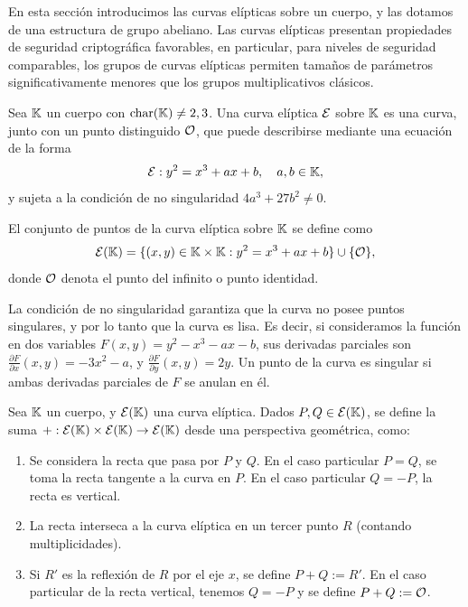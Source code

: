 
En esta sección introducimos las curvas elípticas sobre un cuerpo, y las dotamos de una estructura de grupo abeliano. Las curvas elípticas presentan propiedades de seguridad criptográfica favorables, en particular, para niveles de seguridad comparables, los grupos de curvas elípticas permiten tamaños de parámetros significativamente menores que los grupos multiplicativos clásicos.

\begin{definition}
\label{def:apendice-a-curvas-elipticas-curva-eliptica}
	Sea $\mathbb{K}$ un cuerpo con $\mathrm{char}(\mathbb{K}) \neq 2,3$. Una curva elíptica $\mathcal{E}$ sobre $\mathbb{K}$ es una curva, junto con un punto distinguido $\mathcal{O}$, que puede describirse mediante una ecuación de la forma
	$$\mathcal{E}: y^2 = x^3 + ax + b, \quad a,b \in \mathbb{K},$$
	y sujeta a la condición de no singularidad $4a^3 + 27b^2 \neq 0$.
	
	El conjunto de puntos de la curva elíptica sobre $\mathbb{K}$ se define como
	$$\mathcal{E}(\mathbb{K}) = \{(x,y) \in \mathbb{K} \times \mathbb{K}: y^2 = x^3 + ax + b\} \cup \{\mathcal{O}\},$$
	donde $\mathcal{O}$ denota el punto del infinito o punto identidad.
\end{definition}

La condición de no singularidad garantiza que la curva no posee puntos singulares, y por lo tanto que la curva es lisa. Es decir, si consideramos la función en dos variables $F(x,y) = y^2 - x^3 - ax - b$, sus derivadas parciales son $\frac{\partial F}{\partial x}(x,y) = -3x^2 - a$, y $\frac{\partial F}{\partial y}(x,y) = 2y$. Un punto de la curva es singular si ambas derivadas parciales de $F$ se anulan en él.

\begin{definition}
\label{def:apendice-a-curvas-elipticas-definicion-geometrica-de-suma-en-curvas-elipticas}
	Sea $\mathbb{K}$ un cuerpo, y $\mathcal{E}(\mathbb{K})$ una curva elíptica. Dados $P, Q \in \mathcal{E}(\mathbb{K})$, se define la suma $+: \mathcal{E}(\mathbb{K}) \times \mathcal{E}(\mathbb{K}) \to \mathcal{E}(\mathbb{K})$ desde una perspectiva geométrica, como:
	\begin{enumerate}
		\item Se considera la recta que pasa por $P$ y $Q$. En el caso particular $P = Q$, se toma la recta tangente a la curva en $P$. En el caso particular $Q = -P$, la recta es vertical.
		\item La recta interseca a la curva elíptica en un tercer punto $R$ (contando multiplicidades).
		\item Si $R'$ es la reflexión de $R$ por el eje $x$, se define $P + Q := R'$. En el caso particular de la recta vertical, tenemos $Q = -P$ y se define $P + Q := \mathcal{O}$.
	\end{enumerate}
\end{definition}

